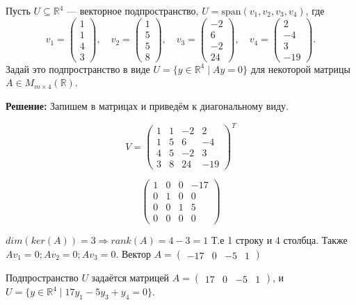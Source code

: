 \documentclass[a4paper,12pt]{article}
\begin{document}
Пусть \( U \subseteq \mathbb{R}^4 \) — векторное подпространство, \( U = \text{span}(v_1, v_2, v_3, v_4) \), где
\[
v_1 =
\begin{pmatrix}
1 \\
1 \\
4 \\
3
\end{pmatrix},
\quad
v_2 =
\begin{pmatrix}
1 \\
5 \\
5 \\
8
\end{pmatrix},
\quad
v_3 =
\begin{pmatrix}
-2 \\
6 \\
-2 \\
24
\end{pmatrix},
\quad
v_4 =
\begin{pmatrix}
2 \\
-4 \\
3 \\
-19
\end{pmatrix}.
\]
Задай это подпространство в виде \( U = \{y \in \mathbb{R}^4 \mid Ay = 0\} \) для некоторой матрицы \( A \in M_{m \times 4}(\mathbb{R}) \).

\textbf{Решение:}
Запишем в матрицах и приведём к диагональному виду.

\[
V =
\begin{pmatrix}
1 & 1 & -2 & 2 \\
1 & 5 & 6 & -4 \\
4 & 5 & -2 & 3 \\
3 & 8 & 24 & -19
\end{pmatrix}^{T}
\]

\[
\begin{pmatrix}
1 & 0 & 0 & -17 \\
0 & 1 & 0 & 0 \\
0 & 0 & 1 & 5 \\
0 & 0 & 0 & 0
\end{pmatrix}
\]

$dim(ker(A))=3 \Longrightarrow rank(A)=4-3 = 1$ Т.е 1 строку и 4 столбца. Также $Av_1 = 0; Av_2 = 0; Av_3 = 0$. Вектор $A = \begin{pmatrix}
    -17 & 0 & -5 & 1
\end{pmatrix}$

Подпространство \( U \) задаётся матрицей \( A = \begin{pmatrix} 17 & 0 & -5 & 1 \end{pmatrix} \), и $ U = \{ y \in \mathbb{R}^4 \mid 17y_1 - 5y_3 + y_4 = 0 \} $.
\end{document}
